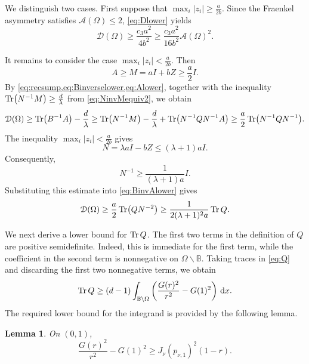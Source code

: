\documentclass{amsart}
\numberwithin{equation}{section}
\theoremstyle{plain}
\newtheorem{lemma}[theorem]{Lemma}
\theoremstyle{definition}
\theoremstyle{plain}
\theoremstyle{remark}
\numberwithin{figure}{section}
\newcommand{\B}{\mathbb{B}}
\newcommand{\D}{\mathcal{D}(\Omega)}
\newcommand{\A}{\mathcal{A}(\Omega)}
\begin{document}
We distinguish two cases. First suppose that $\max_{i} |z_i| \geq \frac{a}{2b}$. Since the Fraenkel asymmetry satisfies $\A\leq 2$, \cref{eq:Dlower} yields
\[
    \D \geq \frac{c_3a^2}{4b^2} \geq \frac{c_3a^2}{16b^2}\A^2.
\]

It remains to consider the case $\max_{i} |z_i| < \frac{a}{2b}$. Then
\begin{equation}
    \label{eq:Alower}
    A\geq M=aI+bZ\geq \frac{a}{2} I.
\end{equation}
By \cref{eq:recsump,eq:Binverselower,eq:Alower}, together with the inequality $\Tr(N^{-1}M)\geq \frac{d}{\lambda}$ from \cref{eq:NinvMequiv2}, we obtain
\begin{equation}
    \label{eq:BinvAlower}
    \D\geq \Tr (B^{-1}A)-\frac{d}{\lambda} \geq \Tr (N^{-1}M)-\frac{d}{\lambda} + \Tr (N^{-1}QN^{-1}A) \geq \frac{a}{2}\Tr (N^{-1}QN^{-1}).
\end{equation}
The inequality $\max_{i} |z_i| < \frac{a}{2b}$ gives
\[
    N=\lambda aI-bZ \leq \left(\lambda+1\right) aI.
\]
Consequently,
\[
    N^{-1}\geq \frac{1}{(\lambda+1)a} I.
\]
Substituting this estimate into \cref{eq:BinvAlower} gives
\begin{equation}
    \label{eq:BinvAlowerQ}
    \D \geq \frac{a}{2}\Tr (QN^{-2}) \geq \frac{1}{2(\lambda+1)^2a}\Tr Q.
\end{equation}

We next derive a lower bound for $\Tr Q$.  The first two terms in the definition of $Q$ are positive semidefinite. Indeed, this is immediate for the first term, while the coefficient in the second term is nonnegative on $\Omega\backslash\B$. Taking traces in \cref{eq:Q} and discarding the first two nonnegative terms, we obtain
\begin{equation}
    \label{eq:TrQ}
    \Tr Q\geq (d-1)\int_{\B\setminus\Omega} \left(\frac{G(r)^2}{r^2}-G(1)^2\right)\,\dd x.
\end{equation}
The required lower bound for the integrand is provided by the following lemma.

\begin{lemma}
    \label{lem:radialremainder}
    On $(0,1)$,
    \begin{equation}
        \label{eq:Gr-G1}
        \frac{G(r)^2}{r^2}-G(1)^2\geq J_\nu(p_{\nu,1})^2(1-r).
    \end{equation}
\end{lemma}
\end{document}
